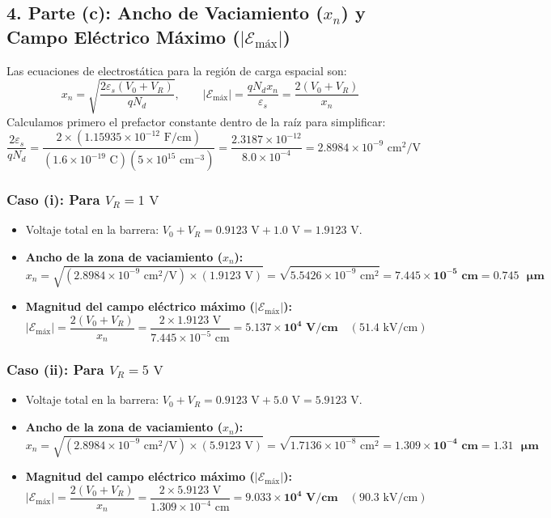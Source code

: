 \documentclass[11pt,a4paper]{article}
\begin{document}
\subsection*{4. Parte (c): Ancho de Vaciamiento ($x_n$) y Campo Eléctrico Máximo ($|\mathcal{E}_{\text{máx}}|$)}
Las ecuaciones de electrostática para la región de carga espacial son:
\[
x_n = \sqrt{\frac{2\varepsilon_s (V_0 + V_R)}{q N_d}}, \qquad |\mathcal{E}_{\text{máx}}| = \frac{q N_d x_n}{\varepsilon_s} = \frac{2(V_0 + V_R)}{x_n}
\]
Calculamos primero el prefactor constante dentro de la raíz para simplificar:
\[
\frac{2\varepsilon_s}{q N_d} = \frac{2 \times (1.15935 \times 10^{-12}\text{ F/cm})}{(1.6 \times 10^{-19}\text{ C})(5 \times 10^{15}\text{ cm}^{-3})} = \frac{2.3187 \times 10^{-12}}{8.0 \times 10^{-4}} = 2.8984 \times 10^{-9}\text{ cm}^2/\text{V}
\]

\subsubsection*{Caso (i): Para $V_R = 1\text{ V}$}
\begin{itemize}
    \item Voltaje total en la barrera: $V_0 + V_R = 0.9123\text{ V} + 1.0\text{ V} = 1.9123\text{ V}$.
    \item \textbf{Ancho de la zona de vaciamiento ($x_n$):}
    \[
    x_n = \sqrt{(2.8984 \times 10^{-9}\text{ cm}^2/\text{V}) \times (1.9123\text{ V})} = \sqrt{5.5426 \times 10^{-9}\text{ cm}^2} = \mathbf{7.445 \times 10^{-5}\text{ cm}} = \mathbf{0.745\text{ }\mu\text{m}}
    \]
    \item \textbf{Magnitud del campo eléctrico máximo ($|\mathcal{E}_{\text{máx}}|$):}
    \[
    |\mathcal{E}_{\text{máx}}| = \frac{2(V_0 + V_R)}{x_n} = \frac{2 \times 1.9123\text{ V}}{7.445 \times 10^{-5}\text{ cm}} = \mathbf{5.137 \times 10^4\text{ V/cm}} \quad (51.4\text{ kV/cm})
    \]
\end{itemize}

\subsubsection*{Caso (ii): Para $V_R = 5\text{ V}$}
\begin{itemize}
    \item Voltaje total en la barrera: $V_0 + V_R = 0.9123\text{ V} + 5.0\text{ V} = 5.9123\text{ V}$.
    \item \textbf{Ancho de la zona de vaciamiento ($x_n$):}
    \[
    x_n = \sqrt{(2.8984 \times 10^{-9}\text{ cm}^2/\text{V}) \times (5.9123\text{ V})} = \sqrt{1.7136 \times 10^{-8}\text{ cm}^2} = \mathbf{1.309 \times 10^{-4}\text{ cm}} = \mathbf{1.31\text{ }\mu\text{m}}
    \]
    \item \textbf{Magnitud del campo eléctrico máximo ($|\mathcal{E}_{\text{máx}}|$):}
    \[
    |\mathcal{E}_{\text{máx}}| = \frac{2(V_0 + V_R)}{x_n} = \frac{2 \times 5.9123\text{ V}}{1.309 \times 10^{-4}\text{ cm}} = \mathbf{9.033 \times 10^4\text{ V/cm}} \quad (90.3\text{ kV/cm})
    \]
\end{itemize}
\end{document}
